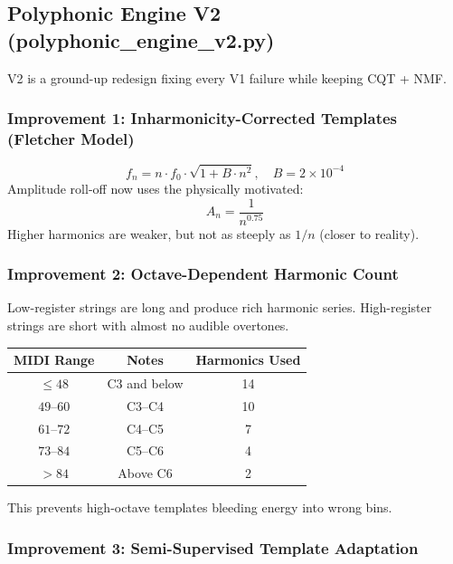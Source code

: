 \documentclass[12pt, a4paper]{article}
\begin{document}
\subsection{Polyphonic Engine V2 (polyphonic\_engine\_v2.py)}

V2 is a ground-up redesign fixing every V1 failure while keeping CQT + NMF.

\subsubsection{Improvement 1: Inharmonicity-Corrected Templates (Fletcher Model)}

\begin{equation}
  f_n = n\cdot f_0\cdot\sqrt{1 + B\cdot n^2}, \quad B = 2\times10^{-4}
\end{equation}
Amplitude roll-off now uses the physically motivated:
\begin{equation}
  A_n = \frac{1}{n^{0.75}}
\end{equation}
Higher harmonics are weaker, but not as steeply as $1/n$ (closer to reality).

\subsubsection{Improvement 2: Octave-Dependent Harmonic Count}

Low-register strings are long and produce rich harmonic series.
High-register strings are short with almost no audible overtones.

\begin{center}
\begin{tabular}{ccc}
  \toprule
  MIDI Range & Notes & Harmonics Used \\
  \midrule
  $\leq 48$  & C3 and below & 14 \\
  $49$--$60$ & C3--C4       & 10 \\
  $61$--$72$ & C4--C5       &  7 \\
  $73$--$84$ & C5--C6       &  4 \\
  $> 84$     & Above C6     &  2 \\
  \bottomrule
\end{tabular}
\end{center}

This prevents high-octave templates bleeding energy into wrong bins.

\subsubsection{Improvement 3: Semi-Supervised Template Adaptation}
\end{document}
